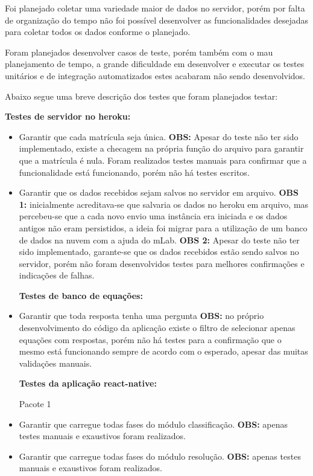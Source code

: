 Foi planejado coletar uma variedade maior de dados no servidor, porém por falta de organização do tempo não foi possível desenvolver as funcionalidades desejadas para coletar todos os dados conforme o planejado. 

Foram planejados desenvolver casos de teste, porém também com o mau planejamento de tempo, a grande dificuldade em desenvolver e executar os testes unitários e de integração automatizados estes acabaram não sendo desenvolvidos.

Abaixo segue uma breve descrição dos testes que foram planejados testar:

\textbf{Testes de servidor no heroku:}
\begin{itemize}
	\item Garantir que cada matrícula seja única. \textbf{OBS:} Apesar do teste não ter sido implementado, existe a checagem na própria função do arquivo para garantir que a matrícula é nula. Foram realizados testes manuais para confirmar que a funcionalidade está funcionando, porém não há testes escritos.  


\item Garantir que os dados recebidos sejam salvos no servidor em arquivo. \textbf{OBS 1:} inicialmente acreditava-se que salvaria os dados no heroku em arquivo, mas percebeu-se que a cada novo envio uma instância era iniciada e os dados antigos não eram persistidos, a ideia foi migrar para a utilização de um banco de dados na nuvem com a ajuda do mLab. \textbf{OBS 2:} Apesar do teste não ter sido implementado, garante-se que os dados recebidos estão sendo salvos no servidor, porém não foram desenvolvidos testes para melhores confirmações e indicações de falhas.  


\textbf{Testes de banco de equações:}
\item Garantir que toda resposta tenha uma pergunta \textbf{OBS:} no próprio desenvolvimento do código da aplicação existe o filtro de selecionar apenas equações com respostas, porém não há testes para a confirmação que o mesmo está funcionando sempre de acordo com o esperado, apesar das muitas validações manuais.  


\textbf{Testes da aplicação react-native:}

	Pacote 1
\item Garantir que carregue todas fases do módulo classificação. \textbf{OBS:} apenas testes manuais e exaustivos foram realizados.  

\item Garantir que carregue todas fases do módulo resolução. \textbf{OBS:} apenas testes manuais e exaustivos foram realizados.  


\end{itemize}
